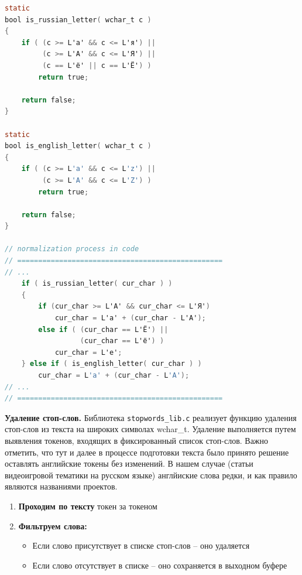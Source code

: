 \begin{lstlisting}[language=C]
static
bool is_russian_letter( wchar_t c )
{
    if ( (c >= L'а' && c <= L'я') || 
         (c >= L'А' && c <= L'Я') || 
         (c == L'ё' || c == L'Ё') )
        return true;

    return false;
}

static
bool is_english_letter( wchar_t c )
{
    if ( (c >= L'a' && c <= L'z') || 
         (c >= L'A' && c <= L'Z') )
        return true;

    return false;
}

// normalization process in code
// =================================================
// ...
    if ( is_russian_letter( cur_char ) )
    {
        if (cur_char >= L'А' && cur_char <= L'Я')
            cur_char = L'а' + (cur_char - L'А');
        else if ( (cur_char == L'Ё') ||
                  (cur_char == L'ё') )
            cur_char = L'е';
    } else if ( is_english_letter( cur_char ) )
        cur_char = L'a' + (cur_char - L'A');
// ...
// =================================================
\end{lstlisting}

\vspace{2em}
\noindent\textbf{Удаление стоп-слов.} Библиотека \texttt{stopwords\_lib.c} реализует функцию удаления стоп-слов из текста на широких символах wchar\_t. Удаление выполняется путем выявления токенов, входящих в фиксированный список стоп-слов. Важно отметить, что тут и далее в процессе подготовки текста было принято решение оставлять английские токены без изменений. В нашем случае (статьи видеоигровой тематики на русском языке) англйиские слова редки, и как правило являются названиями проектов.

\begin{enumerate}
    
    \item \textbf{Проходим по тексту} токен за токеном
    
    \item \textbf{Фильтруем слова:}
    \begin{itemize}
        \item Если слово присутствует в списке стоп-слов – оно удаляется
        \item Если слово отсутствует в списке – оно сохраняется в выходном буфере
    \end{itemize}
\end{enumerate}

